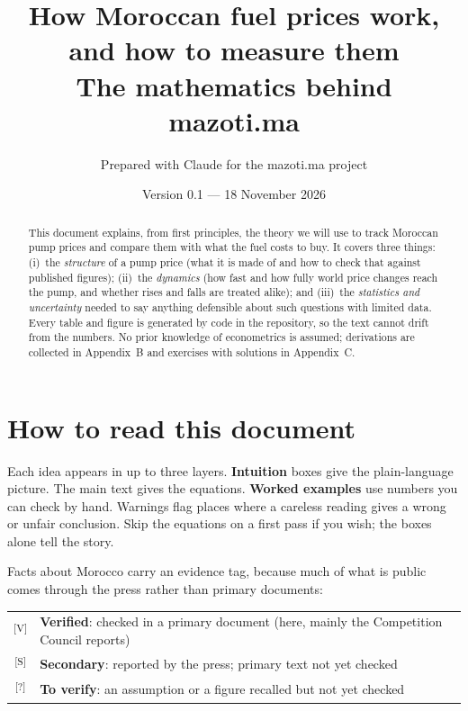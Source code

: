 \documentclass[11pt,a4paper]{article}
\title{\textbf{How Moroccan fuel prices work,\\ and how to measure them}\\[0.4em]
\large The mathematics behind mazoti.ma}
\author{Prepared with Claude for the mazoti.ma project}
\date{Version 0.1 --- 18 November 2026}
\newcommand{\tagV}{\textsuperscript{\textcolor{green!50!black}{\textsf{\scriptsize[V]}}}}
\newcommand{\tagS}{\textsuperscript{\textcolor{orange!80!black}{\textsf{\scriptsize[S]}}}}
\newcommand{\tagQ}{\textsuperscript{\textcolor{red!70!black}{\textsf{\scriptsize[?]}}}}
\theoremstyle{definition}
\begin{document}
\maketitle

\begin{abstract}
\noindent
This document explains, from first principles, the theory we will use to track Moroccan
pump prices and compare them with what the fuel costs to buy. It covers three things:
(i)~the \emph{structure} of a pump price (what it is made of and how to check that against
published figures); (ii)~the \emph{dynamics} (how fast and how fully world price changes reach
the pump, and whether rises and falls are treated alike); and (iii)~the \emph{statistics and
uncertainty} needed to say anything defensible about such questions with limited data.
Every table and figure is generated by code in the repository, so the text cannot drift from the
numbers. No prior knowledge of econometrics is assumed; derivations are collected in
Appendix~B and exercises with solutions in Appendix~C.
\end{abstract}

\tableofcontents
\newpage

\section*{How to read this document}

Each idea appears in up to three layers. \textbf{Intuition} boxes give the plain-language
picture. The main text gives the equations. \textbf{Worked examples} use numbers you can
check by hand. Warnings flag places where a careless reading gives a wrong or unfair
conclusion. Skip the equations on a first pass if you wish; the boxes alone tell the story.

Facts about Morocco carry an evidence tag, because much of what is public comes through the
press rather than primary documents:
\begin{center}
\begin{tabular}{cl}
\tagV & \textbf{Verified}: checked in a primary document (here, mainly the Competition Council reports)\\
\tagS & \textbf{Secondary}: reported by the press; primary text not yet checked\\
\tagQ & \textbf{To verify}: an assumption or a figure recalled but not yet checked
\end{tabular}
\end{center}
\end{document}
